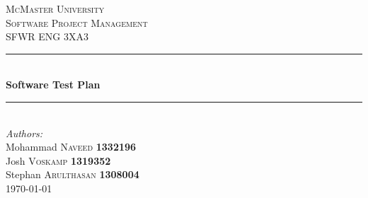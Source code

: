 \documentclass[12pt]{article}
\begin{document}
\sloppy

\begin{titlepage}

\newcommand{\HRule}{\rule{\linewidth}{0.5mm}} %

\center %
 

\textsc{\LARGE McMaster University}\\[1.5cm] %
\textsc{\Large Software Project Management}\\[0.5cm] %
\textsc{\large SFWR ENG 3XA3}\\[0.5cm] %


\HRule \\[0.4cm]
{ \huge \bfseries Software Test Plan}\\[0.4cm] %
\HRule \\[1.5cm]
 



\Large \emph{Authors:}\\
Mohammad \textsc{Naveed} \textbf{1332196} \\ %
Josh \textsc{Voskamp} \textbf{1319352} \\
Stephan \textsc{Arulthasan} \textbf{1308004} \\[3cm]

{\large \today}\\[3cm] %


\end{titlepage}
\end{document}

